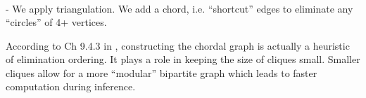 \begin{frame}\frametitle{\subsubsecname}

	

	\\
	
	\pause 
	
	- We apply triangulation. We add a chord, i.e. ``shortcut'' edges to eliminate any ``circles'' of 4+ vertices.
	
	\pause 
	
	According to Ch 9.4.3 in \citep{koller2009probabilistic}, constructing the chordal graph is actually a heuristic of elimination ordering. It plays a role in keeping the size of cliques small. Smaller cliques allow for a more ``modular'' bipartite graph which leads to faster computation during inference.
	
\end{frame}


